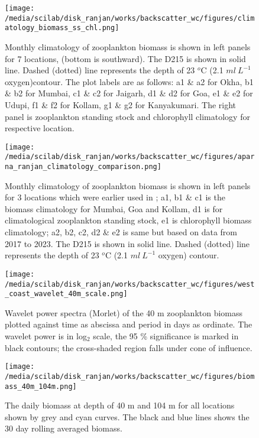 \documentclass{article}
\begin{document}
\begin{figure}[htbp]
	\centering
	\texttt{[image: /media/scilab/disk\_ranjan/works/backscatter\_wc/figures/climatology\_biomass\_ss\_chl.png]} 
	\captionsetup{justification=justified,font=footnotesize,skip=0.05\baselineskip,width=\textwidth}
	\caption{Monthly climatology of zooplankton biomass is shown in left panels for 7 locations, (bottom is southward). The D215 is shown in solid line. Dashed (dotted) line represents the depth of 23 $^o$C (2.1 $ml\ L^{-1}$ oxygen)contour. The plot labels are as follows: a1 \& a2 for Okha, b1 \& b2 for Mumbai, c1 \& c2 for Jaigarh, d1 \& d2 for Goa, e1 \& e2 for Udupi, f1 \& f2 for Kollam, g1 \& g2 for Kanyakumari. The right panel is zooplankton standing stock and chlorophyll climatology for respective location.}
	\label{fig:fig4}
\end{figure}

\begin{figure}[htbp]
	\centering
	\texttt{[image: /media/scilab/disk\_ranjan/works/backscatter\_wc/figures/aparna\_ranjan\_climatology\_comparison.png]} 
	\captionsetup{justification=justified,font=footnotesize,skip=0.05\baselineskip,width=\textwidth}
	\caption{Monthly climatology of zooplankton biomass is shown in left panels for 3 locations which were earlier used in \citep{aparna2022seasonal}; a1, b1 \& c1 is the biomass climatology for Mumbai, Goa and Kollam, d1 is for climatological zooplankton standing stock, e1 is chlorophyll biomass climatology; a2, b2, c2, d2 \& e2 is same but based on data from 2017 to 2023. The D215 is shown in solid line. Dashed (dotted) line represents the depth of 23 $^o$C (2.1 $ml\ L^{-1}$ oxygen) contour. 
	}
	\label{fig:fig5}
\end{figure}


\begin{figure}[htbp]
	\centering
	\texttt{[image: /media/scilab/disk\_ranjan/works/backscatter\_wc/figures/west\_coast\_wavelet\_40m\_scale.png]} 
	\captionsetup{justification=justified,font=footnotesize,skip=0.05\baselineskip,width=\textwidth}
	\caption{Wavelet power spectra (Morlet) of the 40 m zooplankton biomass plotted against time as abscissa and period in days as ordinate. The wavelet power is in log$_2$ scale, the 95 \% significance is marked in black contours; the cross-shaded region falls under cone of influence.}
	\label{fig:fig6}
\end{figure}

\begin{figure}[htbp]
	\centering
	\texttt{[image: /media/scilab/disk\_ranjan/works/backscatter\_wc/figures/biomass\_40m\_104m.png]} 
	\captionsetup{justification=justified,font=footnotesize,skip=0.05\baselineskip,width=\textwidth}
	\caption{The daily biomass at depth of 40 m and 104 m for all locations shown by grey and cyan curves. The black and blue lines shows the 30 day rolling averaged biomass. }
	\label{fig:fig7}
\end{figure}
\end{document}
